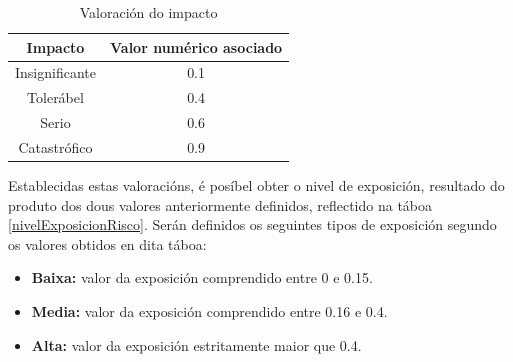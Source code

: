 \begin{itemize}
\begin{table}[]
\centering
\caption{Valoración do impacto}
\label{valoracionImpacto}
\begin{tabular}{|c|c|}
\hline
\textbf{Impacto} & \textbf{Valor numérico asociado} \\ \hline
Insignificante & 0.1 \\ \hline
Tolerábel & 0.4 \\ \hline
Serio & 0.6 \\ \hline
Catastrófico & 0.9 \\ \hline
\end{tabular}
\end{table}

Establecidas estas valoracións, é posíbel obter o nivel de exposición, resultado do produto dos dous valores anteriormente definidos, reflectido na táboa \ref{nivelExposicionRisco}. Serán definidos os seguintes tipos de exposición segundo os valores obtidos en dita táboa:

\begin{itemize}
    \item \textbf{Baixa:} valor da exposición comprendido entre 0 e 0.15.
    \item \textbf{Media:} valor da exposición comprendido entre 0.16 e 0.4.
    \item \textbf{Alta:} valor da exposición estritamente maior que 0.4.
\end{itemize}


\begin{table}[]
\centering
\caption{Nivel de exposición ao risco}
\label{nivelExposicionRisco}
\end{table}

\end{itemize}

